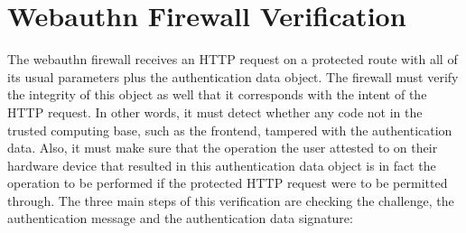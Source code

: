 

\section{Webauthn Firewall Verification}\label{Sec:WebauthnFirewallVerification}

The webauthn firewall receives an HTTP request on a protected route with all of its usual parameters plus the authentication data object. The firewall must verify the integrity of this object as well that it corresponds with the intent of the HTTP request. In other words, it must detect whether any code not in the trusted computing base, such as the frontend, tampered with the authentication data. Also, it must make sure that the operation the user attested to on their hardware device that resulted in this authentication data object is in fact the operation to be performed if the protected HTTP request were to be permitted through. The three main steps of this verification are checking the challenge, the authentication message and the authentication data signature:

